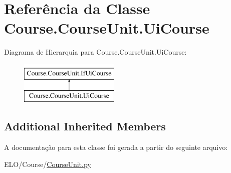 \hypertarget{classCourse_1_1CourseUnit_1_1UiCourse}{\section{Referência da Classe Course.\-Course\-Unit.\-Ui\-Course}
\label{d1/dbb/classCourse_1_1CourseUnit_1_1UiCourse}
}
Diagrama de Hierarquia para Course.\-Course\-Unit.\-Ui\-Course\-:\begin{figure}[H]
\begin{center}
\leavevmode
\includegraphics[height=2.000000cm]{d1/dbb/classCourse_1_1CourseUnit_1_1UiCourse}
\end{center}
\end{figure}
\subsection*{Additional Inherited Members}


A documentação para esta classe foi gerada a partir do seguinte arquivo\-:\begin{DoxyCompactItemize}
\item 
E\-L\-O/\-Course/\hyperlink{CourseUnit_8py}{Course\-Unit.\-py}\end{DoxyCompactItemize}
